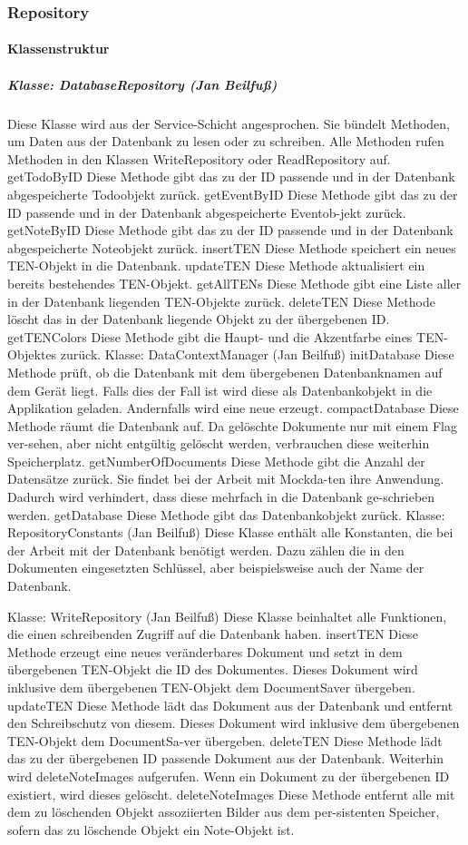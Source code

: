 \subsubsection{Repository}
\paragraph{Klassenstruktur}
\subparagraph{Klasse: DatabaseRepository (Jan Beilfuß)}
Diese Klasse wird aus der Service-Schicht angesprochen. Sie bündelt Methoden, um Daten aus der Datenbank zu lesen oder zu schreiben. Alle Methoden rufen Methoden in den Klassen WriteRepository oder ReadRepository auf.
getTodoByID
Diese Methode gibt das zu der ID passende und in der Datenbank abgespeicherte Todoobjekt zurück. 
getEventByID
Diese Methode gibt das zu der ID passende und in der Datenbank abgespeicherte Eventob-jekt zurück. 
getNoteByID
Diese Methode gibt das zu der ID passende und in der Datenbank abgespeicherte Noteobjekt zurück. 
insertTEN
Diese Methode speichert ein neues TEN-Objekt in die Datenbank.
updateTEN
Diese Methode aktualisiert ein bereits bestehendes TEN-Objekt.
getAllTENs
Diese Methode gibt eine Liste aller in der Datenbank liegenden TEN-Objekte zurück.
deleteTEN
Diese Methode löscht das in der Datenbank liegende Objekt zu der übergebenen ID.
getTENColors
Diese Methode gibt die Haupt- und die Akzentfarbe eines TEN-Objektes zurück.
Klasse: DataContextManager (Jan Beilfuß)
initDatabase
Diese Methode prüft, ob die Datenbank mit dem übergebenen Datenbanknamen auf dem Gerät liegt. Falls dies der Fall ist wird diese als Datenbankobjekt in die Applikation geladen. Andernfalls wird eine neue erzeugt.
compactDatabase
Diese Methode räumt die Datenbank auf. Da gelöschte Dokumente nur mit einem Flag ver-sehen, aber nicht entgültig gelöscht werden, verbrauchen diese weiterhin Speicherplatz.
getNumberOfDocuments
Diese Methode gibt die Anzahl der Datensätze zurück. Sie findet bei der Arbeit mit Mockda-ten ihre Anwendung. Dadurch wird verhindert, dass diese mehrfach in die Datenbank ge-schrieben werden.
getDatabase
Diese Methode gibt das Datenbankobjekt zurück.
Klasse: RepositoryConstants (Jan Beilfuß)
Diese Klasse enthält alle Konstanten, die bei der Arbeit mit der Datenbank benötigt werden. Dazu zählen die in den Dokumenten eingesetzten Schlüssel, aber beispielsweise auch der Name der Datenbank.

Klasse: WriteRepository (Jan Beilfuß)
Diese Klasse beinhaltet alle Funktionen, die einen schreibenden Zugriff auf die Datenbank haben. 
insertTEN
Diese Methode erzeugt eine neues veränderbares Dokument und setzt in dem übergebenen TEN-Objekt die ID des Dokumentes. Dieses Dokument wird inklusive dem übergebenen TEN-Objekt dem DocumentSaver übergeben.
updateTEN
Diese Methode lädt das Dokument aus der Datenbank und entfernt den Schreibschutz von diesem. Dieses Dokument wird inklusive dem übergebenen TEN-Objekt dem DocumentSa-ver übergeben.
deleteTEN
Diese Methode lädt das zu der übergebenen ID passende Dokument aus der Datenbank. Weiterhin wird deleteNoteImages aufgerufen. Wenn ein Dokument zu der übergebenen ID existiert, wird dieses gelöscht.
deleteNoteImages
Diese Methode entfernt alle mit dem zu löschenden Objekt assoziierten Bilder aus dem per-sistenten Speicher, sofern das zu löschende Objekt ein Note-Objekt ist.

